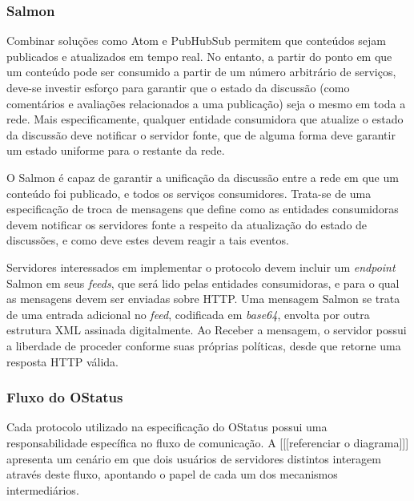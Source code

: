 \subsubsection{Salmon}

Combinar soluções como Atom e PubHubSub permitem que conteúdos sejam publicados e
atualizados em tempo real. No entanto, a partir do ponto em que um conteúdo pode ser
consumido a partir de um número arbitrário de serviços, deve-se investir esforço para
garantir que o estado da discussão (como comentários e avaliações relacionados a uma
publicação) seja o mesmo em toda a rede. Mais especificamente, qualquer entidade
consumidora que atualize o estado da discussão deve notificar o servidor fonte, que
de alguma forma deve garantir um estado uniforme para o restante da rede.

O Salmon é capaz de garantir a unificação da discussão entre a rede em que um
conteúdo foi publicado, e todos os serviços consumidores. Trata-se de uma
especificação de troca de mensagens que define como as entidades consumidoras devem
notificar os servidores fonte a respeito da atualização do estado de discussões, e
como deve estes devem reagir a tais eventos.

Servidores interessados em implementar o protocolo devem incluir um \textit{endpoint}
Salmon em seus \textit{feeds}, que será lido pelas entidades consumidoras, e para o
qual as mensagens devem ser enviadas sobre HTTP. Uma mensagem Salmon se trata de uma
entrada adicional no \textit{feed}, codificada em \textit{base64}, envolta por outra
estrutura XML assinada digitalmente. Ao Receber a mensagem, o servidor possui a
liberdade de proceder conforme suas próprias políticas, desde que retorne uma
resposta HTTP válida.

\subsubsection{Fluxo do OStatus}

Cada protocolo utilizado na especificação do OStatus possui uma responsabilidade
específica no fluxo de comunicação. A [[[referenciar o diagrama]]] apresenta um
cenário em que dois usuários de servidores distintos interagem através deste fluxo,
apontando o papel de cada um dos mecanismos intermediários.



